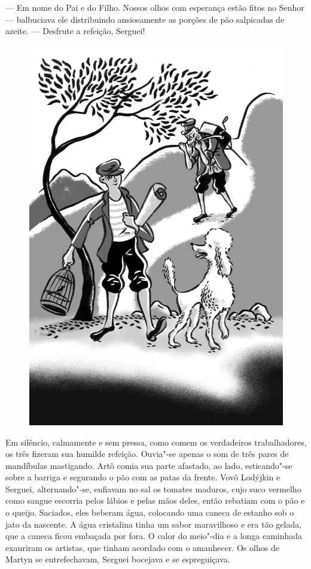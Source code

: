 --- Em nome do Pai e do Filho. Nossos olhos com esperança estão fitos no
Senhor --- balbuciava ele distribuindo ansiosamente as porções de pão
salpicadas de azeite. --- Desfrute a refeição, Serguei!

\begin{figure}%
\vspace*{-1.6cm}
\hspace*{-2.3cm}\includegraphics{./imgs/cena10.jpg}
\end{figure}

Em silêncio, calmamente e sem pressa, como comem os verdadeiros
trabalhadores, os três fizeram sua humilde refeição. Ouvia"-se apenas o
som de três pares de mandíbulas mastigando. Artô comia sua parte
afastado, ao lado, esticando"-se sobre a barriga e segurando o pão com as
patas da frente. Vovô Lodýjkin e Serguei, alternando"-se, enfiavam no sal
os tomates maduros, cujo suco vermelho como sangue escorria pelos lábios
e pelas mãos deles, então rebatiam com o pão e o queijo. Saciados, eles
beberam água, colocando uma caneca de estanho sob o jato da nascente. A
água cristalina tinha um sabor maravilhoso e era tão gelada, que a
caneca ficou embaçada por fora. O calor do meio"-dia e a longa caminhada
exauriram os artistas, que tinham acordado com o amanhecer. Os olhos de
Martyn se entrefechavam, Serguei bocejava e se espreguiçava.

